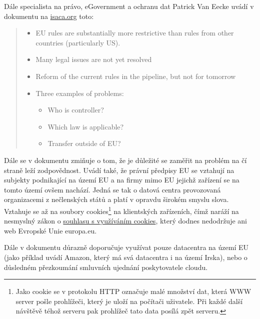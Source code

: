 Dále specialista na právo, eGovernment a ochranu dat Patrick Van Eecke uvádí v dokumentu na \href{http://www.isaca.org/Groups/Professional-English/cloud-computing/GroupDocuments/DLA_Cloud\%20computing\%20legal\%20issues.pdf}{isaca.org\cite{isaca:legalIssues}} toto:
\begin{quote}
	\begin{itemize}
		\item EU rules are substantially more restrictive than rules from other countries (particularly US).
		\item Many legal issues are not yet resolved
		\item Reform of the current rules in the pipeline, but not for tomorrow
		\item Three examples of problems:
		\begin{itemize}
			\item Who is controller?
			\item Which law is applicable?
			\item Transfer outside of EU?
		\end{itemize}
	\end{itemize}
\end{quote}
Dále se v dokumentu zmiňuje o tom, že je důležité se zaměřit na problém na čí straně leží zodpovědnost. Uvádí také, že právní předpisy EU se vztahují na subjekty podnikající na území EU a na firmy mimo EU jejichž zařízení se na tomto území ovšem nachází. Jedná se tak o datová centra provozovaná organizacemi z nečlenských států a platí v opravdu širokém smyslu slova. Vztahuje se až na soubory cookies\footnote{Jako cookie se v protokolu HTTP označuje malé množství dat, která WWW server pošle prohlížeči, který je uloží na počítači uživatele. Při každé další návštěvě téhož serveru pak prohlížeč tato data posílá zpět serveru.\cite{wiki:cookies}} na klientských zařízeních, čímž naráží na nesmyslný zákon o \href{http://www.justit.cz/wordpress/2011/05/26/vcera-vstoupilo-v-platnost-susenkove-narizeni-eu-a-hned-bylo-odlozeno-o-rok/}{souhlasu s využíváním cookies\cite{justit:susenky}}, který dodnes nedodržuje ani web Evropské Unie europa.eu.

Dále v dokumentu důrazně doporučuje využívat pouze datacentra na území EU (jako příklad uvádí Amazon, který má svá datacentra i na území Irska), nebo o důsledném přezkoumání smluvních ujednání poskytovatele cloudu.\cite{isaca:legalIssues}

\newpage
